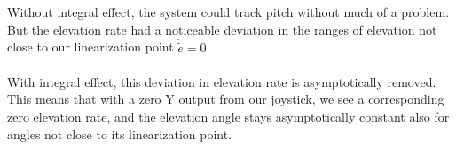 Without integral effect, the system could track pitch without much of a problem. But the elevation rate had a noticeable deviation in the ranges of elevation not close to our linearization point $\dot{\tilde{e}} = 0$. %
\\
\\
With integral effect, this deviation in elevation rate is asymptotically removed. This means that with a zero Y output from our joystick, we see a corresponding zero elevation rate, and the elevation angle stays asymptotically constant also for angles not close to its linearization point.


